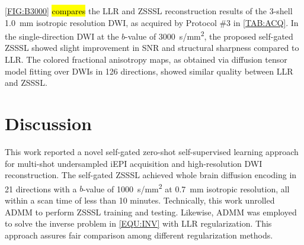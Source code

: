 \documentclass[journal,twoside,web]{ieeecolor}
\begin{document}
	\cref{FIG:B3000} \hl{compares} the LLR and ZSSSL reconstruction results
	of the 3-shell \SI{1.0}{mm} isotropic resolution DWI,
	as acquired by Protocol \#3 in \cref{TAB:ACQ}.
	In the single-direction DWI at the $b$-value of \SI{3000}{s/mm^2}, 
	the proposed self-gated ZSSSL 
	showed slight improvement in SNR and structural sharpness 
	compared to LLR. The colored fractional anisotropy maps, 
	as obtained via diffusion tensor model fitting over DWIs in 126 directions, 
	showed similar quality between LLR and ZSSSL.
	


	\section{Discussion}

	This work reported a novel self-gated zero-shot self-supervised learning approach
	for multi-shot undersampled iEPI acquisition and high-resolution DWI reconstruction.
	The self-gated ZSSSL achieved whole brain diffusion encoding in 21 directions
	with a $b$-value of \SI{1000}{s/mm^2}
	at \SI{0.7}{mm} isotropic resolution,
	all within a scan time of less than 10 minutes.
	Technically, this work unrolled ADMM to perform ZSSSL training and testing.
	Likewise, ADMM was employed to solve the inverse problem in \cref{EQU:INV}
	with LLR regularization.
	This approach assures fair comparison among different regularization methods.

\end{document}
